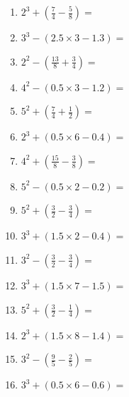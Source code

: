 \documentclass[12pt]{article}
\begin{document}
\begin{enumerate}
\item \large $ 2^{3} + (\frac{7}{4} - \frac{5}{8}) = $ \vspace{1.6cm}
\item \large $ 3^{3} - (2.5 \times 3 - 1.3) = $ \vspace{1.6cm}
\item \large $ 2^{2} - (\frac{13}{8} + \frac{3}{4}) = $ \vspace{1.6cm}
\item \large $ 4^{2} - (0.5 \times 3 - 1.2) = $ \vspace{1.6cm}
\item \large $ 5^{2} + (\frac{7}{4} + \frac{1}{2}) = $ \vspace{1.6cm}
\item \large $ 2^{3} + (0.5 \times 6 - 0.4) = $ \vspace{1.6cm}
\newpage
\item \large $ 4^{2} + (\frac{15}{8} - \frac{3}{8}) = $ \vspace{1.6cm}
\item \large $ 5^{2} - (0.5 \times 2 - 0.2) = $ \vspace{1.6cm}
\item \large $ 5^{2} + (\frac{3}{2} - \frac{3}{4}) = $ \vspace{1.6cm}
\item \large $ 3^{3} + (1.5 \times 2 - 0.4) = $ \vspace{1.6cm}
\item \large $ 3^{2} - (\frac{3}{2} - \frac{3}{4}) = $ \vspace{1.6cm}
\item \large $ 3^{3} + (1.5 \times 7 - 1.5) = $ \vspace{1.6cm}
\item \large $ 5^{2} + (\frac{3}{2} - \frac{1}{4}) = $ \vspace{1.6cm}
\item \large $ 2^{3} + (1.5 \times 8 - 1.4) = $ \vspace{1.6cm}
\item \large $ 3^{2} - (\frac{9}{5} - \frac{2}{5}) = $ \vspace{1.6cm}
\item \large $ 3^{3} + (0.5 \times 6 - 0.6) = $ \vspace{1.6cm}
\end{enumerate}\newpage
\end{document}
